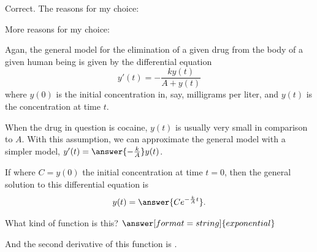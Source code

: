 \documentclass{ximera}
\begin{document}
\begin{question}
\begin{question}
Correct.  The reasons for my choice:  
\begin{selectAll}
\end{selectAll}

More reasons for my choice: 
\begin{selectAll}
\end{selectAll}
\end{question}
\end{question}


Agan, the general model for  the elimination of a given drug from the body of a given human being is given by the differential equation 
$$y'(t)=-\frac{ky(t)}{A+y(t)}$$
where $y(0)$ is the initial concentration in, say, milligrams per liter, and $y(t)$ is the concentration at time $t$. 

\begin{question}
When the drug in question is cocaine, $y(t)$ is usually very small in comparison to $A$.   With this assumption, we can approximate the general model with a simpler model, $y'(t)=\answer{-\frac{k}{A}}y(t)$.    

If where $C=y(0)$ the initial concentration at time $t=0$, then the general solution to this differential equation is 
\[  
y(t) =\answer{Ce^{-\frac{k}{A}t}}. 
\]

What kind of function is this? $\answer[format=string]{exponential}$

And the second derivative of this function is .  
\end{question}
\end{document}

